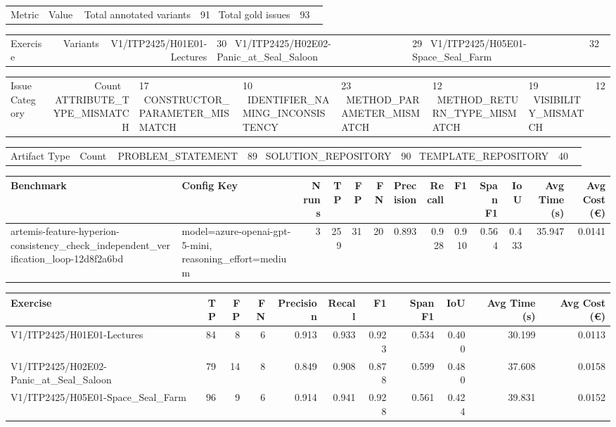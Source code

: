 \begin{tabular}{lr}
Metric & Value \
\hline
Total annotated variants & 91 \
Total gold issues & 93 \
\end{tabular}

\begin{tabular}{lr}
Exercise & Variants \
\hline
V1/ITP2425/H01E01-Lectures & 30 \
V1/ITP2425/H02E02-Panic\_at\_Seal\_Saloon & 29 \
V1/ITP2425/H05E01-Space\_Seal\_Farm & 32 \
\end{tabular}

\begin{tabular}{lr}
Issue Category & Count \
\hline
ATTRIBUTE\_TYPE\_MISMATCH & 17 \
CONSTRUCTOR\_PARAMETER\_MISMATCH & 10 \
IDENTIFIER\_NAMING\_INCONSISTENCY & 23 \
METHOD\_PARAMETER\_MISMATCH & 12 \
METHOD\_RETURN\_TYPE\_MISMATCH & 19 \
VISIBILITY\_MISMATCH & 12 \
\end{tabular}

\begin{tabular}{lr}
Artifact Type & Count \
\hline
PROBLEM\_STATEMENT & 89 \
SOLUTION\_REPOSITORY & 90 \
TEMPLATE\_REPOSITORY & 40 \
\end{tabular}

\begin{tabular}{llrrrrrrrrrrr}
Benchmark & Config Key & N runs & TP & FP & FN & Precision & Recall & F1 & Span F1 & IoU & Avg Time (s) & Avg Cost (€) \\
\hline
artemis-feature-hyperion-consistency\_check\_independent\_verification\_loop-12d8f2a6bd & model=azure-openai-gpt-5-mini, reasoning\_effort=medium & 3 & 259 & 31 & 20 & 0.893 & 0.928 & 0.910 & 0.564 & 0.433 & 35.947 & 0.0141 \\
\end{tabular}

\begin{tabular}{lrrrrrrrrrr}
Exercise & TP & FP & FN & Precision & Recall & F1 & Span F1 & IoU & Avg Time (s) & Avg Cost (€) \\
\hline
V1/ITP2425/H01E01-Lectures & 84 & 8 & 6 & 0.913 & 0.933 & 0.923 & 0.534 & 0.400 & 30.199 & 0.0113 \\
V1/ITP2425/H02E02-Panic\_at\_Seal\_Saloon & 79 & 14 & 8 & 0.849 & 0.908 & 0.878 & 0.599 & 0.480 & 37.608 & 0.0158 \\
V1/ITP2425/H05E01-Space\_Seal\_Farm & 96 & 9 & 6 & 0.914 & 0.941 & 0.928 & 0.561 & 0.424 & 39.831 & 0.0152 \\
\end{tabular}
